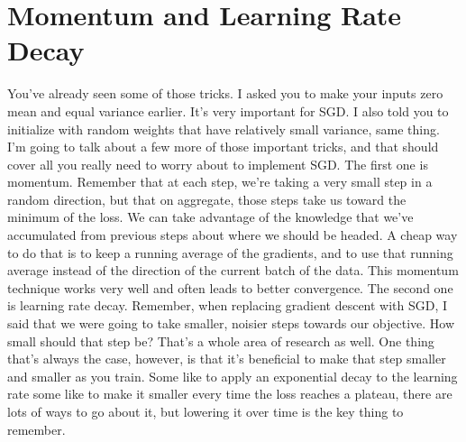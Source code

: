 \documentclass{article}
\begin{document}
\section{Momentum and Learning Rate Decay}
You've already seen
some of those tricks.
I asked you to make your inputs zero
mean and equal variance earlier.
It's very important for SGD.
I also told you to initialize
with random weights
that have relatively small variance,
same thing.
I'm going to talk about a few more
of those important tricks, and
that should cover all you really need
to worry about to implement SGD.
The first one is momentum.
Remember that at each step, we're taking
a very small step in a random direction,
but that on aggregate, those steps take
us toward the minimum of the loss.
We can take advantage of
the knowledge that we've accumulated
from previous steps about
where we should be headed.
A cheap way to do that is to keep
a running average of the gradients, and
to use that running average instead
of the direction of the current
batch of the data.
This momentum technique works very well
and often leads to better convergence.
The second one is learning rate decay.
Remember, when replacing gradient
descent with SGD, I said that we were
going to take smaller,
noisier steps towards our objective.
How small should that step be?
That's a whole area of research as well.
One thing that's always the case,
however,
is that it's beneficial to make that
step smaller and smaller as you train.
Some like to apply an exponential decay
to the learning rate some like to make
it smaller every time the loss reaches
a plateau, there are lots of ways to go
about it, but lowering it over
time is the key thing to remember.
\end{document}
